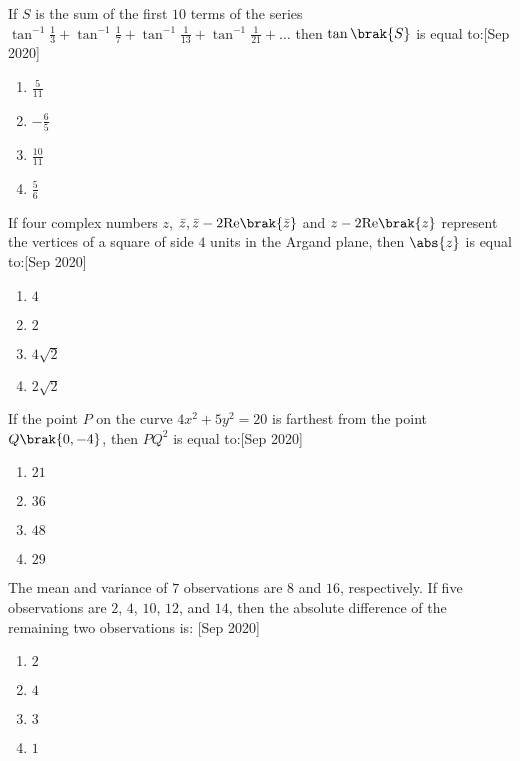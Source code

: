     \item If $S$ is the sum of the first $10$ terms of the series $\tan^{-1} \frac{1}{3} + \tan^{-1} \frac{1}{7} + \tan^{-1} \frac{1}{13} + \tan^{-1} \frac{1}{21} + \dots$ then $\tan\brak{S}$ is equal to:\hfill{[Sep 2020]}
    \begin{enumerate}
        \item $\frac{5}{11}$
        \item $-\frac{6}{5}$
        \item $\frac{10}{11}$
        \item $\frac{5}{6}$
    \end{enumerate}

    \item If four complex numbers $z$, $\bar{z},\bar{z} - 2 \text{Re}\brak{\bar{z}}$ and $z - 2 \text{Re}\brak{z}$ represent the vertices of a square of side $4$ units in the Argand plane, then $\abs{z}$ is equal to:\hfill{[Sep 2020]}
    \begin{enumerate}
        \item $4$
        \item $2$
        \item $4\sqrt{2}$
        \item $2\sqrt{2}$
    \end{enumerate}

    \item If the point $P$ on the curve $4x^2 + 5y^2 = 20$ is farthest from the point $Q\brak{0, -4}$, then $PQ^2$ is equal to:\hfill{[Sep 2020]}
    \begin{enumerate}
        \item $21$
        \item $36$
        \item $48$
        \item $29$
    \end{enumerate}

    \item The mean and variance of $7$ observations are $8$ and $16$, respectively. If five observations are $2$, $4$, $10$, $12$, and $14$, then the absolute difference of the remaining two observations is: \hfill{[Sep 2020]}
    \begin{enumerate}
        \item $2$
        \item $4$
        \item $3$
        \item $1$
    \end{enumerate}



